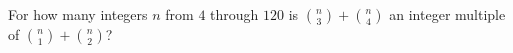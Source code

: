 For how many integers $n$ from $4$ through $120$ is $\binom n3+\binom n4$ an integer multiple of $\binom n1+\binom n2$?
